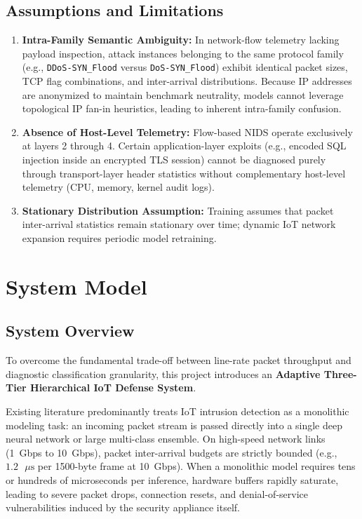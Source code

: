 \documentclass[12pt,a4paper]{report}
\begin{document}
\section{Assumptions and Limitations}
\begin{enumerate}
    \item \textbf{Intra-Family Semantic Ambiguity:} In network-flow telemetry lacking payload inspection, attack instances belonging to the same protocol family (e.g., \texttt{DDoS-SYN\_Flood} versus \texttt{DoS-SYN\_Flood}) exhibit identical packet sizes, TCP flag combinations, and inter-arrival distributions. Because IP addresses are anonymized to maintain benchmark neutrality, models cannot leverage topological IP fan-in heuristics, leading to inherent intra-family confusion.
    \item \textbf{Absence of Host-Level Telemetry:} Flow-based NIDS operate exclusively at layers 2 through 4. Certain application-layer exploits (e.g., encoded SQL injection inside an encrypted TLS session) cannot be diagnosed purely through transport-layer header statistics without complementary host-level telemetry (CPU, memory, kernel audit logs).
    \item \textbf{Stationary Distribution Assumption:} Training assumes that packet inter-arrival statistics remain stationary over time; dynamic IoT network expansion requires periodic model retraining.
\end{enumerate}



\chapter{System Model}

\section{System Overview}
To overcome the fundamental trade-off between line-rate packet throughput and diagnostic classification granularity, this project introduces an \textbf{Adaptive Three-Tier Hierarchical IoT Defense System}. 

Existing literature predominantly treats IoT intrusion detection as a monolithic modeling task: an incoming packet stream is passed directly into a single deep neural network or large multi-class ensemble. On high-speed network links (1~Gbps to 10~Gbps), packet inter-arrival budgets are strictly bounded (e.g., $1.2\text{ }\mu\text{s}$ per 1500-byte frame at 10~Gbps). When a monolithic model requires tens or hundreds of microseconds per inference, hardware buffers rapidly saturate, leading to severe packet drops, connection resets, and denial-of-service vulnerabilities induced by the security appliance itself.
\end{document}

